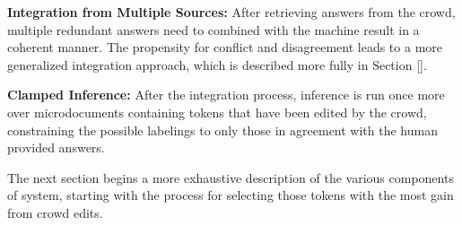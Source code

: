 {\textbf{Integration from Multiple Sources:} After retrieving answers from the crowd, multiple redundant answers need to combined with the machine result in a coherent manner.  The propensity for conflict and disagreement leads to a more generalized integration approach, which is described more fully in Section \ref{}.

\textbf{Clamped Inference:} After the integration process, inference is run once more over microdocuments containing tokens that have been edited by the crowd, constraining the possible labelings to only those in agreement with the human provided answers.

The next section begins a more exhaustive description of the various components of \sysName system, starting with the process for selecting those tokens with the most gain from crowd edits.}
